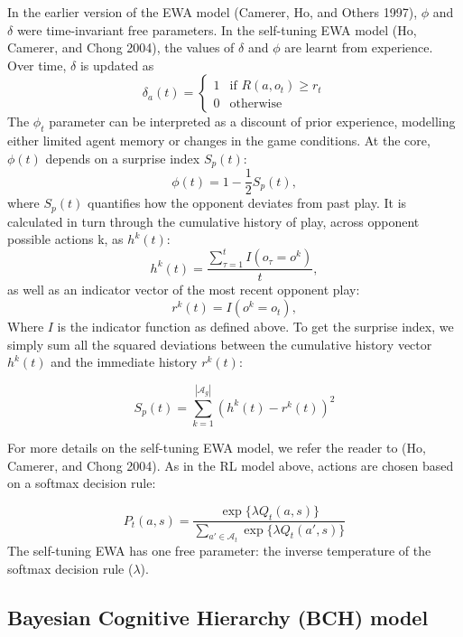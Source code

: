 \documentclass[smallextended]{svjour3}       %
\begin{document}
In the earlier version of the EWA model (Camerer, Ho, and Others 1997),
\(\phi\) and \(\delta\) were time-invariant free parameters. In the
self-tuning EWA model (Ho, Camerer, and Chong 2004), the values of
\(\delta\) and \(\phi\) are learnt from experience. Over time,
\(\delta\) is updated as
\[\delta_{a}(t) = \begin{cases} 1 & \text{if }  R(a,o_{t}) \geq r_{t}  \\
0 & \text{otherwise} \end{cases}\] The \(\phi_{t}\) parameter can be
interpreted as a discount of prior experience, modelling either limited
agent memory or changes in the game conditions. At the core, \(\phi(t)\)
depends on a surprise index \(S_{p}(t)\):
\[\phi(t) = 1 - \frac{1}{2}S_{p}(t) ,\] where \(S_{p}(t)\) quantifies
how the opponent deviates from past play. It is calculated in turn
through the cumulative history of play, across opponent possible actions
k, as \(h^{k}(t)\):
\[h^{k}(t)= \frac{ \sum_{\tau = 1}^t  I( o_{\tau} = o^k )} {t}, \] as
well as an indicator vector of the most recent opponent play:
\[r^k(t) = I(o^k=o_{t}), \] Where \(I\) is the indicator function as
defined above. To get the surprise index, we simply sum all the squared
deviations between the cumulative history vector \(h^{k}(t)\) and the
immediate history \(r^k(t)\):

\[S_{p}(t) = \sum_{k=1}^{|\mathcal{A}_g|} (h^{k}(t) - r^k(t))^2 \]

For more details on the self-tuning EWA model, we refer the reader to
(Ho, Camerer, and Chong 2004). As in the RL model above, actions are
chosen based on a softmax decision rule:

\[P_t(a,s) = \frac{\exp \{\lambda  Q_{t}(a,s) \} }{\sum_{a' \in \mathcal{A}_t} \exp \{ \lambda Q_{t}(a',s) \} } \]
The self-tuning EWA has one free parameter: the inverse temperature of
the softmax decision rule (\(\lambda\)).

\hypertarget{bayesian-cognitive-hierarchy-bch-model}{%
\subsection{Bayesian Cognitive Hierarchy (BCH)
model}\label{bayesian-cognitive-hierarchy-bch-model}}
\end{document}

